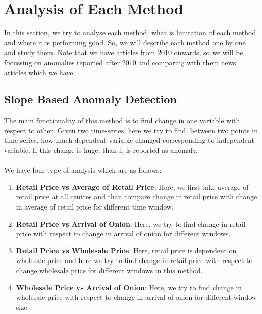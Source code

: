 \documentclass[a4paper,10pt]{report}
\begin{document}
	
\section{Analysis of Each Method}

In this section, we try to analyse each method, what is limitation of each method and where it is performing good. So, we will describe each method one by one and study them. Note that we have articles from 2010 onwards, so we will be focussing on anomalies reported after 2010 and comparing with them news articles which we have.

\subsection{Slope Based Anomaly Detection}
	
		The main functionality of this method is to find change in one variable with respect to other. Given two time-series, here we try to find, between two points in time series, how much dependent variable changed corresponding to independent variable. If this change is huge, than it is reported as anomaly.\\
		\\
		We have four type of analysis which are as follows:
		\begin{enumerate}
			\item \textbf{Retail Price vs Average of Retail Price}: Here, we first take average of retail price at all centres and than compare change in retail price with change in average of retail price for different time window.			
			\item \textbf{Retail Price vs Arrival of Onion}: Here, we try to find change in retail price with respect to change in arrival of onion for different windows. 
			\item \textbf{Retail Price vs Wholesale Price}: Here, retail price is dependent on wholesale price and here we try to find change in retail price with respect to change wholesale price for different windows in this method.
			\item \textbf{Wholesale Price vs Arrival of Onion}: Here, we try to find change in wholesale price with respect to change in arrival of onion for different window size.
		\end{enumerate}
		
\end{document}
